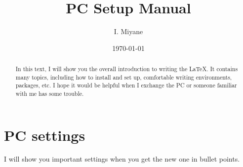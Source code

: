 \documentclass[a4paper,pdftex]{article}
\title{PC Setup Manual}
\author{I. Miyane}
\date{\today}
\begin{document}
\maketitle

\begin{abstract}
  In this text, I will show you the overall introduction to writing the \LaTeX. It contains many topics, including how to install and set up, comfortable writing environments, packages, etc. I hope it would be helpful when I exchange the PC or someone familiar with me has some trouble.
\end{abstract}

\tableofcontents

\clearpage
\section{PC settings}

I will show you important settings when you get the new one in bullet points.
\end{document}
